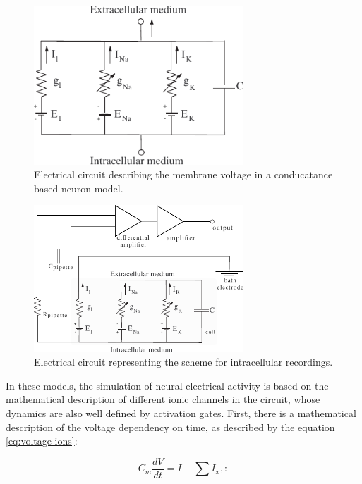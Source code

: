 \begin{figure}[htb!]
	\centering
	\includegraphics[width=0.7\textwidth]{./img/intro/electrical_circuit.pdf}
	\caption{Electrical circuit describing the membrane voltage in a conducatance based neuron model.}
	\label{fig:electrical circuit}
\end{figure}

\begin{figure}[htb!]
	\centering
	\includegraphics[width=0.7\textwidth]{./img/intro/intracellular_recording_circuit.pdf}
	\caption{Electrical circuit representing the scheme for intracellular recordings.}
	\label{fig:clamp circuit}
\end{figure}


In these models, the simulation of neural electrical activity is based on the mathematical description of different ionic channels in the circuit, whose dynamics are also well defined by activation gates. First, there is a mathematical description of the voltage dependency on time, as described by the equation \ref{eq:voltage ions}:

\begin{equation}
 C_m \frac{dV}{dt} = I - \sum I_{x},
  \label{eq:voltage ions}:
\end{equation}

